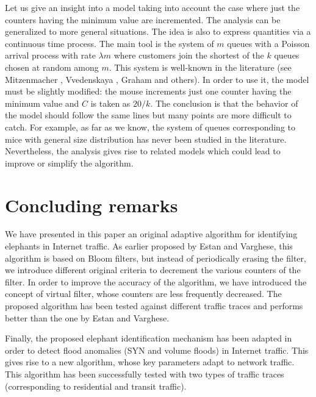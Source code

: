 \documentclass{amsart}
\begin{document}
Let us give an insight into  a model taking into account the case where just the counters
having the minimum value are incremented. The analysis can be generalized to  more
general situations. The idea is also to express quantities via a continuous time
process. The main tool is the system of $m$ queues with a Poisson arrival process with
rate $\lambda m$ where customers join the shortest of the $k$ queues chosen at random
among $m$. This system is well-known in the literature (see Mitzenmacher
\cite{Mitzenmacher-1}, Vvedenskaya \cite{Vvedenskaya-1}, Graham \cite{Graham-3} and
others). In order to use it, the model must be  slightly modified: the mouse increments
just one counter having the minimum value and $C$ is taken as $20/k$. The conclusion is
that the  behavior of the model should follow the same lines but many points are more
difficult  to catch. For example, as far as we know, the system of queues corresponding to
mice with general size distribution has never been studied in the
literature. Nevertheless,  the analysis gives rise to related models which could lead to
improve or simplify the algorithm. 


\section{Concluding remarks}
\label{conclusion}

We have presented  in this paper an original adaptive  algorithm for identifying elephants
in Internet traffic. As earlier proposed by Estan and Varghese, this algorithm is based on
Bloom  filters, but instead  of periodically  erasing the  filter, we  introduce different
original criteria to decrement the various counters of the filter. In order to improve the accuracy
of the  algorithm, we have  introduced the concept  of virtual filter, whose  counters are
less  frequently decreased.  The  proposed  algorithm has  been  tested against  different
traffic traces and performs better than the one by Estan and Varghese.

Finally, the  proposed elephant  identification mechanism  has been adapted  in order  to detect
flood  anomalies (SYN  and volume  floods) in  Internet traffic.  This gives  rise to  a new
algorithm,  whose  key  parameters adapt  to  network  traffic.  This algorithm  has  been
successfully  tested  with   two  types  of  traffic traces  (corresponding  to
residential  and transit traffic).
\end{document}
